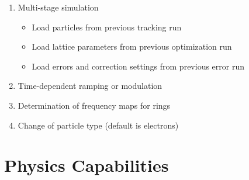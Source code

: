 \documentclass[11pt]{article}
\begin{document}
\begin{enumerate}
\item Multi-stage simulation
  \begin{itemize}
  \item Load particles from previous tracking run
  \item Load lattice parameters from previous optimization run
  \item Load errors and correction settings from previous error run
  \end{itemize}
\item Time-dependent ramping or modulation
\item Determination of frequency maps for rings
\item Change of particle type (default is electrons)
\end{enumerate}

\section{Physics Capabilities}
\end{document}
